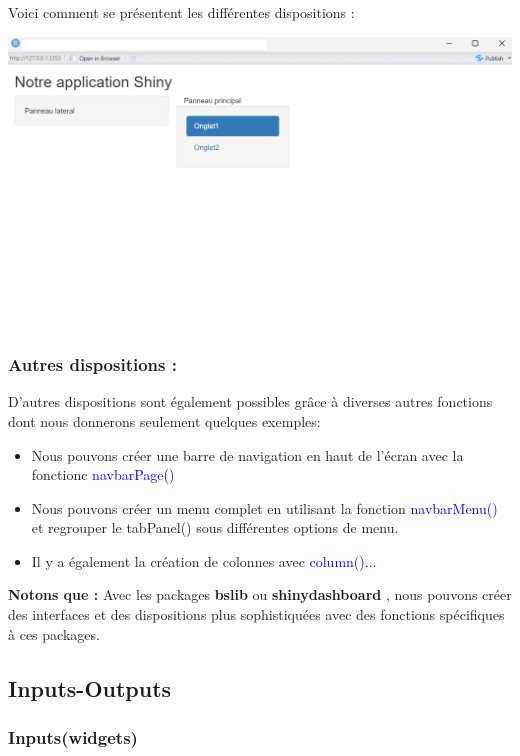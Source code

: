 \documentclass[
]{article}
\begin{document}
Voici comment se présentent les différentes dispositions :

\includegraphics{images/clipboard-2646785340.png}

\hypertarget{autres-dispositions}{%
\subsubsection{Autres dispositions :}\label{autres-dispositions}}

D'autres dispositions sont également possibles grâce à diverses autres
fonctions dont nous donnerons seulement quelques exemples:

\begin{itemize}
\item
  Nous pouvons créer une barre de navigation en haut de l'écran avec la
  fonctionc \textcolor{blue}{navbarPage()}
\item
  Nous pouvons créer un menu complet en utilisant la fonction
  \textcolor{blue}{navbarMenu()} et regrouper le tabPanel() sous
  différentes options de menu.
\item
  Il y a également la création de colonnes avec
  \textcolor{blue}{column()...}
\end{itemize}

\textbf{Notons que :} Avec les packages \textbf{bslib} ou
\textbf{shinydashboard} , nous pouvons créer des interfaces et des
dispositions plus sophistiquées avec des fonctions spécifiques à ces
packages.

\hypertarget{inputs-outputs}{%
\subsection{Inputs-Outputs}\label{inputs-outputs}}

\hypertarget{inputswidgets}{%
\subsubsection{Inputs(widgets)}\label{inputswidgets}}
\end{document}
